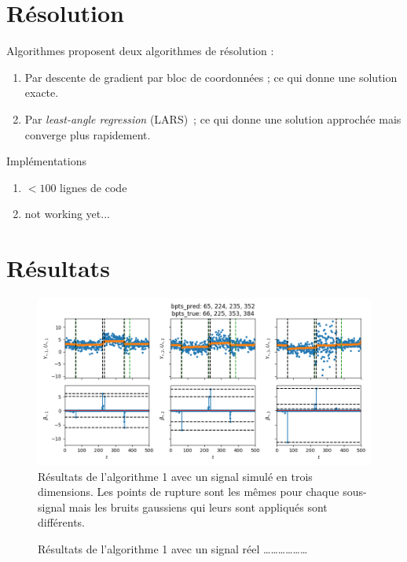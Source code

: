 \documentclass{beamer}
\theoremstyle{definition}
\begin{document}
\section{Résolution}
	\begin{frame}[allowframebreaks]{\insertsection}
		\begin{block}{Algorithmes}
			\citet{gfl} proposent deux algorithmes de résolution :
			\begin{enumerate}
				\item Par descente de gradient par bloc de coordonnées ; ce qui donne une solution exacte.
				\item Par \textit{least-angle regression} (LARS) ; ce qui donne une solution approchée mais converge plus rapidement.
			\end{enumerate}
		\end{block}
	
		\begin{block}{Implémentations}
			\begin{enumerate}
				\item $<100$ lignes de code
				\item not working yet...
			\end{enumerate}
		\end{block}
	\end{frame}

\section{Résultats}
	\begin{frame}[allowframebreaks]{\insertsection}
		\begin{figure}
			\includegraphics[width=1\textwidth]{algo1simu.png}
			\caption{Résultats de l'algorithme 1 avec un signal simulé en trois dimensions. Les points de rupture sont les mêmes pour chaque sous-signal mais les bruits gaussiens qui leurs sont appliqués sont différents.}
			\label{fig:algo1simu}
		\end{figure}
	
		\begin{figure}
			\caption{Résultats de l'algorithme 1 avec un signal réel ………………}
			\label{fig:algo1real}
		\end{figure}
	\end{frame}
\end{document}
